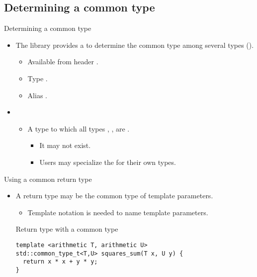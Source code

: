 \subsection{Determining a common type}

\begin{frame}[t,fragile]{Determining a common type}
\begin{itemize}
  \item The library provides a  to determine
        the common type among several types ().
    \begin{itemize}
      \item Available from header .
      \item Type .
      \item Alias .
    \end{itemize}

  \item {}
    \begin{itemize}
      \item A type to which all types , , \cppid{\ldots} are 
            .
         \begin{itemize}
           \item It may not exist.
           \item Users may specialize the  for their own types.
         \end{itemize}
    \end{itemize}
\end{itemize}
\end{frame}

\begin{frame}[t,fragile]{Using a common return type}
\begin{itemize}
  \item A return type may be the common type of template parameters.
    \begin{itemize}
      \item Template notation is needed to name template parameters.
    \end{itemize}

\begin{block}{Return type with a common type}
\begin{lstlisting}
template <arithmetic T, arithmetic U>
std::common_type_t<T,U> squares_sum(T x, U y) {
  return x * x + y * y;
}
\end{lstlisting}
\end{block}

\end{itemize}
\end{frame}
